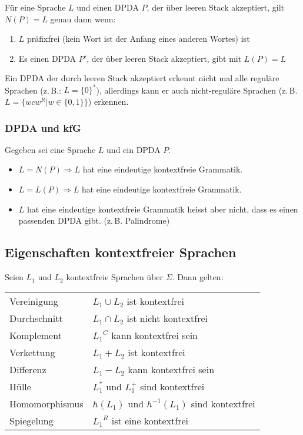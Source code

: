 Für eine Sprache $L$ und einen DPDA $P$, der über leeren Stack akzeptiert, gilt $N(P) = L$ genau dann wenn:
\begin{enumerate}\itemsep0em
	\item $L$ präfixfrei (kein Wort ist der Anfang eines anderen Wortes) ist
	\item Es einen DPDA $P'$, der über leeren Stack akzeptiert, gibt mit $L(P) = L$ 
\end{enumerate}

Ein DPDA der durch leeren Stack akzeptiert erkennt nicht mal alle reguläre Sprachen (z.\,B.: $L = \{0\}^*$), allerdings kann er auch nicht-reguläre Sprachen (z.\,B. $L=\{wcw^R | w \in \{0, 1\}\}$) erkennen.

\subsubsection{DPDA und kfG}
Gegeben sei eine Sprache $L$ und ein DPDA $P$.
\begin{itemize}\itemsep0em
	\item $L = N(P) \Rightarrow L$ hat eine eindeutige kontextfreie Grammatik.
	\item $L = L(P) \Rightarrow L$ hat eine eindeutige kontextfreie Grammatik.
	\item $L$ hat eine eindeutige kontextfreie Grammatik heisst aber nicht, dass es einen passenden DPDA gibt. (z.\,B. Palindrome)
\end{itemize}

\subsection{Eigenschaften kontextfreier Sprachen}
Seien $L_1$ und $L_2$ kontextfreie Sprachen über $\Sigma$. Dann gelten:
\settowidth{\MyLenA}{ Homomorphismus~~}
\begin{tabular}{@{}p{\the\MyLenA}%
				@{}p{\linewidth-\the\MyLenA}}
	Vereinigung & $L_1 \cup L_2$ ist kontextfrei\\
	Durchschnitt & $L_1 \cap L_2$ ist nicht kontextfrei\\
	Komplement & ${L_1}^C$ kann kontextfrei sein\\
	Verkettung & $L_1 + L_2$ ist kontextfrei\\
	Differenz & $L_1 - L_2$ kann kontextfrei sein\\
	Hülle & $L_1^*$ und $ L_1^+$ sind kontextfrei\\
	Homomorphismus & $h(L_1)$ und $h^{-1}(L_1)$ sind kontextfrei\\
	Spiegelung & ${L_1}^R$ ist eine kontextfrei\\
\end{tabular}

